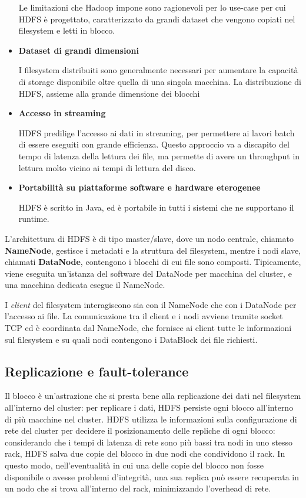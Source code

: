 \documentclass[italian,a4paper, twoside, 12pt]{report}
\begin{document}
\begin{itemize}
  Le limitazioni che Hadoop impone sono ragionevoli per lo use-case per
  cui HDFS è progettato, caratterizzato da grandi dataset che vengono
  copiati nel filesystem e letti in blocco.
\item
  \textbf{Dataset di grandi dimensioni}

  I filesystem distribuiti sono generalmente necessari per aumentare la
  capacità di storage disponibile oltre quella di una singola macchina.
  La distribuzione di HDFS, assieme alla grande dimensione dei blocchi
\item
  \textbf{Accesso in streaming}

  HDFS predilige l'accesso ai dati in streaming, per permettere ai
  lavori batch di essere eseguiti con grande efficienza. Questo
  approccio va a discapito del tempo di latenza della lettura dei file,
  ma permette di avere un throughput in lettura molto vicino ai tempi di
  lettura del disco.
\item
  \textbf{Portabilità su piattaforme software e hardware eterogenee}

  HDFS è scritto in Java, ed è portabile in tutti i sistemi che ne
  supportano il runtime.
\end{itemize}

L'architettura di HDFS è di tipo master/slave, dove un nodo centrale,
chiamato \textbf{NameNode}, gestisce i metadati e la struttura del
filesystem, mentre i nodi slave, chiamati \textbf{DataNode}, contengono
i blocchi di cui file sono composti. Tipicamente, viene eseguita
un'istanza del software del DataNode per macchina del cluster, e una
macchina dedicata esegue il NameNode.

I \emph{client} del filesystem interagiscono sia con il NameNode che con
i DataNode per l'accesso ai file. La comunicazione tra il client e i
nodi avviene tramite socket TCP ed è coordinata dal NameNode, che
fornisce ai client tutte le informazioni sul filesystem e su quali nodi
contengono i DataBlock dei file richiesti.

\subsection{Replicazione e
fault-tolerance}\label{replicazione-e-fault-tolerance}

Il blocco è un'astrazione che si presta bene alla replicazione dei dati
nel filesystem all'interno del cluster: per replicare i dati, HDFS
persiste ogni blocco all'interno di più macchine nel cluster. HDFS
utilizza le informazioni sulla configurazione di rete del cluster per
decidere il posizionamento delle repliche di ogni blocco: considerando
che i tempi di latenza di rete sono più bassi tra nodi in uno stesso
rack, HDFS salva due copie del blocco in due nodi che condividono il
rack. In questo modo, nell'eventualità in cui una delle copie del blocco
non fosse disponibile o avesse problemi d'integrità, una sua replica può
essere recuperata in un nodo che si trova all'interno del rack,
minimizzando l'overhead di rete.
\end{document}
